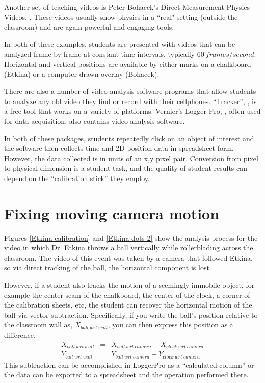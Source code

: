 \documentclass[prb,twocolumn]{revtex4-2}
\newcommand{\bea}{\begin{eqnarray}}
\newcommand{\eea}{\end{eqnarray}}
\begin{document}
Another set of teaching videos is Peter Bohacek's Direct Measurement Physics Videos, \cite{Bohacek_overview} .
These videos usually show physics in a ``real" setting (outside the classroom) and are again powerful and engaging tools.  

In both of these examples, students are presented with videos that can be analyzed frame by frame at constant time intervals, typically $60~frames/second$.  Horizontal and vertical positions are available by either marks on a chalkboard (Etkina) or a computer drawn overlay (Bohacek).  

There are also a number of video analysis software programs that allow students to analyze any old video they find or record with their cellphones.  ``Tracker'', \cite{Tracker}, is a free tool that works on a variety of platforms. Vernier's Logger Pro, \cite{LoggerPro}, often used for data acquisition, also contains video analysis software.  


In both of these packages, students repeatedly click on an object of interest and the software then collects time and 2D position data  in spreadsheet form.  However, the data collected is in units of an x,y pixel pair.  Conversion from pixel to physical dimension is a student task, and the quality of student results can depend on the ``calibration stick''\cite{calibration_stick} they employ.

\section{Fixing moving camera motion} 
Figures \ref{Etkina-calibration} and \ref{Etkina-dots-2} show the analysis process for the video in which Dr. Etkina throws a ball vertically while rollerblading across the classroom.  The video of this event was taken by a camera that followed Etkina, so via direct tracking of the ball, the horizontal component is lost.

However, if a student also tracks the motion of a seemingly immobile object, for example the center seam of the chalkboard, the center of the clock, a corner of the calibration sheets, etc, the student can recover the horizontal motion of the ball via vector subtraction.  Specifically, if you write  the ball's position relative to the classroom wall as, $X_{ball~wrt~wall}$, you can then express this position as a difference.
\bea
X_{ball~wrt~wall} &=& X_{ball~wrt~camera}-X_{clock~wrt~camera} \nonumber\\ 
Y_{ball~wrt~wall} &=& Y_{ball~wrt~camera}-Y_{clock~wrt~camera}\nonumber
\eea
This subtraction can be accomplished in LoggerPro as a ``calculated column'' or the data can be exported to a spreadsheet and the operation performed there.  
\end{document}

